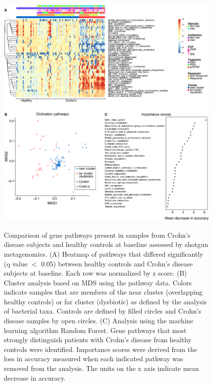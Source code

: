 \begin{figure}[p]
\centering
{\includegraphics[scale=0.45,trim=0 0 0 0,clip]{Figure/F22_Pathway_Cluster_Heatmap.pdf}}
\caption[Comparison of gene pathways present in samples from Crohn's disease subjects and healthy controls at baseline]{Comparison of gene pathways present in samples from Crohn's disease subjects and healthy controls at baseline assessed by shotgun metagenomics.
(A) Heatmap of pathways that differed significantly (q value $<$ 0.05) between healthy controls and Crohn's disease subjects at baseline. Each row was normalized by z score.
(B) Cluster analysis based on MDS using the pathway data. Colors indicate samples that are members of the near cluster (overlapping healthy controls) or far cluster (dysbiotic) as defined by the analysis of bacterial taxa. Controls are defined by filled circles and Crohn's disease samples by open circles.
(C) Analysis using the machine learning algorithm Random Forest. Gene pathways that most strongly distinguish patients with Crohn's disease from healthy controls were identified. Importance scores were derived from the loss in accuracy measured when each indicated pathway was removed from the analysis. The units on the x axis indicate mean decrease in accuracy. }
\label{F22_Pathway_Cluster_Heatmap}
\end{figure}




